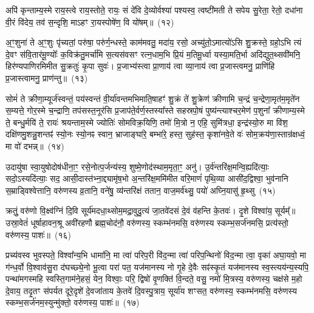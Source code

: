 अपि॑ कृन्ताम्य॒स्मे राय॒स्त्वे राय॒स्तोते॒ रायः॒ सं दे॑वि दे॒व्योर्वश्या॑ पश्यस्व॒ त्वष्टी॑मती ते सपेय सु॒रेता॒ रेतो॒ दधा॑ना वी॒रं वि॑देय॒ तव॑ स॒न्दृशि॒ मा\-ऽहꣳ रा॒यस्पोषे॑ण॒ वि यो॑षम्॥~(१२)

{\anuvakamend[{अ॒स्य॒ ग्री॒वा एका॒न्नत्रि॒ꣳ॒शच्च॑}]}%

अ॒ꣳ॒शुना॑ ते अ॒ꣳ॒शुः पृ॑च्यतां॒ परु॑षा॒ परु॑र्ग॒न्धस्ते॒ काम॑मवतु॒ मदा॑य॒ रसो॒ अच्यु॑तो॒\-ऽमात्यो॑\-ऽसि शु॒क्रस्ते॒ ग्रहो॒\-ऽभि त्यं दे॒वꣳ स॑वि॒तार॑मू॒ण्योः᳚ क॒विक्र॑तु॒मर्चा॑मि स॒त्यस॑वसꣳ रत्न॒धाम॒भि प्रि॒यं म॒तिमू॒र्ध्वा यस्या॒मति॒र्भा अदि॑द्युत॒थ्सवी॑मनि॒ हिर॑ण्यपाणिरमिमीत सु॒क्रतुः॑ कृ॒पा सुवः॑। प्र॒जाभ्य॑स्त्वा प्रा॒णाय॑ त्वा व्या॒नाय॑ त्वा प्र॒जास्त्वमनु॒ प्राणि॑हि प्र॒जास्त्वामनु॒ प्राण॑न्तु॥~(१३)

{\anuvakamend[{अनु॑ स॒प्त च॑}]}%

सोमं॑ ते क्रीणा॒म्यूर्ज॑स्वन्तं॒ पय॑स्वन्तं वी॒र्या॑वन्तमभिमाति॒\-षाहꣳ॑ शु॒क्रं ते॑ शु॒क्रेण॑ क्रीणामि च॒न्द्रं च॒न्द्रेणा॒मृत॑म॒मृते॑न स॒म्यत्ते॒ गोर॒स्मे च॒न्द्राणि॒ तप॑सस्त॒नूर॑सि प्र॒जाप॑ते॒र्वर्ण॒स्तस्या᳚स्ते सहस्रपो॒षं पुष्य॑न्त्याश्चर॒मेण॑ प॒शुना᳚ क्रीणाम्य॒स्मे ते॒ बन्धु॒र्मयि॑ ते॒ रायः॑ श्रयन्ताम॒स्मे ज्योतिः॑ सोमविक्र॒यिणि॒ तमो॑ मि॒त्रो न॒ एहि॒ सुमि॑त्रधा॒ इन्द्र॑स्यो॒रु मा वि॑श॒ दक्षि॑णमु॒शन्नु॒शन्तꣴ॑ स्यो॒नः स्यो॒नꣴ स्वान॒ भ्राजाङ्घा॑रे॒ बम्भा॑रे॒ हस्त॒ सुह॑स्त॒ कृशा॑नवे॒ते वः॑ सोम॒क्रय॑णा॒स्तान्र॑क्षध्वं॒ मा वो॑ दभन्न्॥~(१४)

{\anuvakamend[{ऊ॒रुं द्वाविꣳ॑शतिश्व}]}%

उदायु॑षा स्वा॒युषोदोष॑धीना॒ꣳ॒ रसे॒नोत्प॒र्जन्य॑स्य॒ शुष्मे॒णोद॑स्था\-म॒मृता॒ꣳ॒ अनु॑। उ॒र्व॑न्तरि॑क्ष॒मन्वि॒ह्यदि॑त्याः॒ सदो॒\-ऽस्यदि॑त्याः॒ सद॒ आसी॒\-दास्त॑भ्ना॒द्द्यामृ॑ष॒भो अ॒न्तरि॑क्ष॒ममि॑मीत वरि॒माणं॑ पृथि॒व्या आसी॑द॒द्विश्वा॒ भुव॑नानि स॒म्राड्विश्वेत्तानि॒ वरु॑णस्य व्र॒तानि॒ वने॑षु॒ व्य॑न्तरि॑क्षं ततान॒ वाज॒मर्व॑थ्सु॒ पयो॑ अघ्नि॒यासु॑ हृ॒थ्सु~(१५)

क्रतुं॒ वरु॑णो वि॒क्ष्व॑ग्निं दि॒वि सूर्य॑मदधा॒थ्सोम॒मद्रा॒वुदु॒त्यं जा॒तवे॑दसं दे॒वं व॑हन्ति के॒तवः॑। दृ॒शे विश्वा॑य॒ सूर्यम्᳚॥ उस्रा॒वेतं॑ धूर्\mbox{}षाहावन॒श्रू अवी॑रहणौ ब्रह्म॒चोद॑नौ॒ वरु॑णस्य॒ स्कम्भ॑नमसि॒ वरु॑णस्य स्कम्भ॒सर्ज॑नमसि॒ प्रत्य॑स्तो॒ वरु॑णस्य॒ पाशः॑॥~(१६)

{\anuvakamend[{हृ॒थ्सु पञ्च॑त्रिꣳशच्च}]}%

प्रच्य॑वस्व भुवस्पते॒ विश्वा᳚न्य॒भि धामा॑नि॒ मा त्वा॑ परिप॒री वि॑द॒न्मा त्वा॑ परिप॒न्थिनो॑ विद॒न्मा त्वा॒ वृका॑ अघा॒यवो॒ मा ग॑न्ध॒र्वो वि॒श्वाव॑सु॒रा द॑घच्छ्ये॒नो भू॒त्वा परा॑ पत॒ यज॑मानस्य नो गृ॒हे दे॒वैः सꣴ॑स्कृ॒तं यज॑मानस्य स्व॒स्त्यय॑न्य॒स्यपि॒ पन्था॑मगस्महि स्वस्ति॒गाम॑ने॒हसं॒ येन॒ विश्वाः॒ परि॒ द्विषो॑ वृ॒णक्ति॑ वि॒न्दते॒ वसु॒ नमो॑ मि॒त्रस्य॒ वरु॑णस्य॒ चक्ष॑से म॒हो दे॒वाय॒ तदृ॒तꣳ स॑पर्यत दूरे॒\-दृशे॑ दे॒व\-जा॑ताय के॒तवे॑ दि॒वस्पु॒त्राय॒ सूर्या॑य शꣳसत॒ वरु॑णस्य॒ स्कम्भ॑\-नमसि॒ वरु॑णस्य स्कम्भ॒\-सर्ज॑नम॒स्युन्मु॑क्तो॒ वरु॑णस्य॒ पाशः॑॥~(१७)

